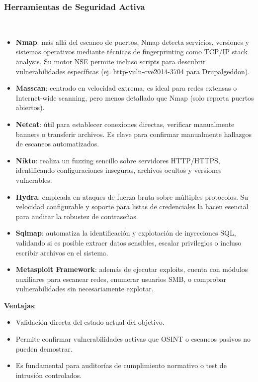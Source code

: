 \documentclass[runningheads]{llncs}
\begin{document}
\subsubsection{Herramientas de Seguridad Activa}
\hfill\\
\begin{itemize}
\item \textbf{Nmap}: más allá del escaneo de puertos, Nmap detecta servicios, versiones y sistemas operativos mediante técnicas de fingerprinting como TCP/IP stack analysis. Su motor NSE permite incluso scripts para descubrir vulnerabilidades específicas (ej. http-vuln-cve2014-3704 para Drupalgeddon).

\item\textbf{Masscan}: centrado en velocidad extrema, es ideal para redes extensas o Internet-wide scanning, pero menos detallado que Nmap (solo reporta puertos abiertos).

\item \textbf{Netcat}: útil para establecer conexiones directas, verificar manualmente banners o transferir archivos. Es clave para confirmar manualmente hallazgos de escaneos automatizados.

\item \textbf{Nikto}: realiza un fuzzing sencillo sobre servidores HTTP/HTTPS, identificando configuraciones inseguras, archivos ocultos y versiones vulnerables.

\item \textbf{Hydra}: empleada en ataques de fuerza bruta sobre múltiples protocolos. Su velocidad configurable y soporte para listas de credenciales la hacen esencial para auditar la robustez de contraseñas.

\item \textbf{Sqlmap}: automatiza la identificación y explotación de inyecciones SQL, validando si es posible extraer datos sensibles, escalar privilegios o incluso escribir archivos en el sistema.

\item \textbf{Metasploit Framework}: además de ejecutar exploits, cuenta con módulos auxiliares para escanear redes, enumerar usuarios SMB, o comprobar vulnerabilidades sin necesariamente explotar.
\end{itemize}

\textbf{Ventajas}:
\begin{itemize}
\item Validación directa del estado actual del objetivo.
\item Permite confirmar vulnerabilidades activas que OSINT o escaneos pasivos no pueden demostrar.
\item Es fundamental para auditorías de cumplimiento normativo o test de intrusión controlados.
\end{itemize}
\end{document}
